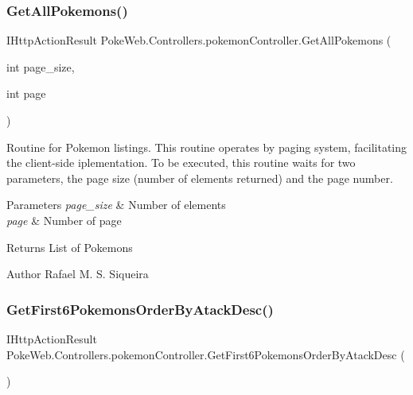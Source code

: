 \subsubsection{\texorpdfstring{Get\+All\+Pokemons()}{GetAllPokemons()}}
{\footnotesize\ttfamily I\+Http\+Action\+Result Poke\+Web.\+Controllers.\+pokemon\+Controller.\+Get\+All\+Pokemons (\begin{DoxyParamCaption}\item[{int}]{page\+\_\+size,  }\item[{int}]{page }\end{DoxyParamCaption})\hspace{0.3cm}{\ttfamily [inline]}}

Routine for Pokemon listings. This routine operates by paging system, facilitating the client-\/side iplementation. To be executed, this routine waits for two parameters, the page size (number of elements returned) and the page number.


\begin{DoxyParams}{Parameters}
{\em page\+\_\+size} & Number of elements \\
\hline
{\em page} & Number of page \\
\hline
\end{DoxyParams}
\begin{DoxyReturn}{Returns}
List of Pokemons 
\end{DoxyReturn}
\begin{DoxyAuthor}{Author}
Rafael M. S. Siqueira 
\end{DoxyAuthor}
\mbox{\label{class_poke_web_1_1_controllers_1_1pokemon_controller_a631a03b01ec3e0b99e9751c2f9def3bb}} 
\subsubsection{\texorpdfstring{Get\+First6\+Pokemons\+Order\+By\+Atack\+Desc()}{GetFirst6PokemonsOrderByAtackDesc()}}
{\footnotesize\ttfamily I\+Http\+Action\+Result Poke\+Web.\+Controllers.\+pokemon\+Controller.\+Get\+First6\+Pokemons\+Order\+By\+Atack\+Desc (\begin{DoxyParamCaption}{ }\end{DoxyParamCaption})\hspace{0.3cm}{\ttfamily [inline]}}

